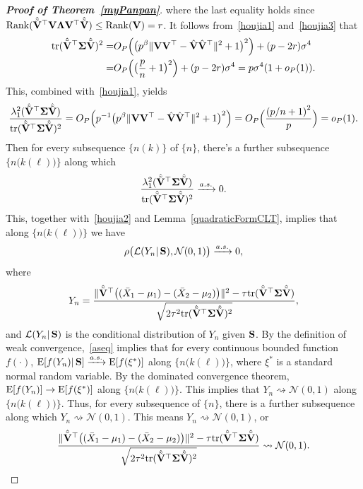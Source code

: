 \documentclass[times,sort&compress,3p]{elsarticle}
\newcommand{\mytr}{ {\rm tr} }
\newcommand{\myrank}{{\rm Rank}}
\newcommand{\myE}{ {\rm E} }
\theoremstyle{plain}
\theoremstyle{definition}
\theoremstyle{remark}
\begin{document}
\begin{appendices}
\begin{proof}[\textbf{Proof of Theorem~\ref{myPanpan}}]
where the last equality holds since $\myrank(\hat{\tilde{\BV}}^\top  \BV \bLambda \BV^\top  \hat{\tilde{\BV}})\leq \myrank(\BV)=r$.
It follows from~\eqref{houjia1} and~\eqref{houjia3} that
\begin{equation}\label{traceA1}
    \begin{aligned}
        \mytr(\hat{\tilde{\BV}}^\top \bSigma\hat{\tilde{\BV}})^2=&
    O_P\Big(\big(p^{\beta}\|\BV\BV^\top -\hat{\BV}\hat{\BV}^\top \|^2+1\big)^2\Big)
    +
    (p-2r)\sigma^4\\
    =&
        O_P\Big(\big(\frac{p}{n}+1\big)^2\Big)
    +
    (p-2r)\sigma^4
    =p\sigma^4(1+o_P(1)).
    \end{aligned}
\end{equation}
This, combined with~\eqref{houjia1}, yields
$$
\frac{\lambda_1^2(\hat{\tilde{\BV}}^\top \bSigma\hat{\tilde{\BV}})}{\mytr(\hat{\tilde{\BV}}^\top \bSigma\hat{\tilde{\BV}})^2}
=O_P\Big(p^{-1}\big(p^{\beta}\|\BV\BV^\top -\hat{\BV}\hat{\BV}^\top \|^2+1\big)^2\Big)
        =O_P\Big(\frac{{(p/n+1)}^2}{p}\Big)=o_P(1).
$$
Then for every subsequence $\{n(k)\}$ of $\{n\}$, there's a further subsequence $\big\{n\big(k(\ell)\big)\big\}$ along which
$$
\frac{\lambda_1^2(\hat{\tilde{\BV}}^\top \bSigma\hat{\tilde{\BV}})}{\mytr(\hat{\tilde{\BV}}^\top \bSigma\hat{\tilde{\BV}})^2}\xrightarrow{a.s.}0.
$$
This, together with~\eqref{houjia2} and Lemma~\ref{quadraticFormCLT}, implies that along $\big\{n\big(k(\ell)\big)\big\}$ we have
\begin{equation}\label{aseq}
    \rho\big(\mathcal{L}( Y_n |\,\mathbf{S}),\mathcal{N}(0,1)\big)\xrightarrow{a.s.}0,
\end{equation}
where 
$$
Y_n=\frac{\|\hat{\tilde{\mathbf{V}}}^\top \big((\bar{X}_1-\mu_1)-(\bar{X}_2-\mu_2)\big)\|^2-\tau\mathrm{tr}(\hat{\tilde{\mathbf{V}}}^\top \boldsymbol{\Sigma}\hat{\tilde{\mathbf{V}}})}{\sqrt{2\tau^2\mathrm{tr}(\hat{\tilde{\mathbf{V}}}^\top \boldsymbol{\Sigma}\hat{\tilde{\mathbf{V}}})^2}},
$$
and $\mathcal{L}(Y_n|\,\mathbf{S})$ is the conditional distribution of $Y_n$ given $\mathbf{S}$.
By the definition of weak convergence,~\eqref{aseq} implies that for every continuous bounded function $f(\cdot)$, $\myE[f(Y_n)|\,\BS]\xrightarrow{a.s.}\myE[f(\xi^*)]$ along $\big\{n\big(k(\ell)\big)\big\}$, where $\xi^*$ is a standard normal random variable.
By the dominated convergence theorem, $\myE[f(Y_n)]\to \myE[f(\xi^*)]$ along $\big\{n\big(k(\ell)\big)\big\}$.
This implies that $Y_n\rightsquigarrow \mathcal{N}(0,1)$ along $\big\{n\big(k(\ell)\big)\big\}$.
Thus, for every subsequence of $\{n\}$, there is a further subsequence along which
$Y_n\rightsquigarrow \mathcal{N}(0,1)$.
This means $Y_n\rightsquigarrow \mathcal{N}(0,1)$, or
$$
\frac{\|\hat{\tilde{\mathbf{V}}}^\top \big((\bar{X}_1-\mu_1)-(\bar{X}_2-\mu_2)\big)\|^2-\tau\mathrm{tr}(\hat{\tilde{\mathbf{V}}}^\top \boldsymbol{\Sigma}\hat{\tilde{\mathbf{V}}})}{\sqrt{2\tau^2\mathrm{tr}(\hat{\tilde{\mathbf{V}}}^\top \boldsymbol{\Sigma}\hat{\tilde{\mathbf{V}}})^2}}\rightsquigarrow \mathcal{N}(0,1).
$$



\end{proof}
\end{appendices}
\end{document}

